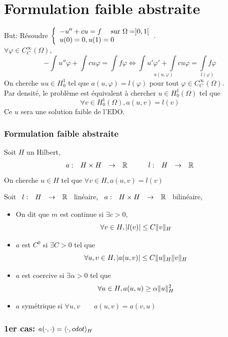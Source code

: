 \documentclass[]{report}
\begin{document}
    \section{Formulation faible abstraite}

    But: Résoudre $\left\{\begin{array}{ll} -u''+cu=f\quad\text{ sur $\Omega=]0,1[$}\\ u(0)=0,u(1)=0 \end{array} \right.$.\\
    $\forall \varphi\in C_C^\infty(\Omega)$,
    \[-\int u''\varphi+\int cu\varphi=\int f\varphi\iff \underset{a(u,\varphi)}{\int u'\varphi'+\int cu\varphi}=\underset{l(\varphi)}{\int f\varphi}\]
    On cherche $uu\in H_0^1$ tel que $a(u,\varphi)=l(\varphi)$ pour tout $\varphi \in C_C^\infty(\Omega)$.\\
    Par densité, le problème est équivalent à chercher $u\in H_0^1(\Omega)$ tel que
    \[\forall v\in H_0^1(\Omega),a(u,v)=l(v)\]
    Ce $u$ sera une solution faible de l'EDO.

    \subsubsection*{Formulation faible abstraite}

    Soit $H$ un Hilbert,
    \[\begin{array}{ccccc} a : & H\times H & \to & \mathbb{R} \end{array}\qquad \begin{array}{ccccc} l : & H & \to & \mathbb{R} \end{array}\]
    On cherche $u\in H$ tel que $\forall v\in H,a(u,v)=l(v)$

    \begin{df}{}{}
        Soit $\begin{array}{ccccc} l : & H & \to & \mathbb{R} \end{array}$ linéaire, $\begin{array}{ccccc} a : & H\times H & \to & \mathbb{R} \end{array}$ bilinéaire,
        \begin{itemize}
            \item On dit que $m$ est continue si $\exists c>0$,
            \[\forall v\in H,|l(v)|\le C\lVert v \rVert_H\]
            \item $a$ est $C^0$ si $\exists C>0$ tel que
            \[\forall u,v\in H,\left|a(u,v)\right|\le C\lVert u \rVert_H\lVert v \rVert_H\]
            \item $a$ est coercive si $\exists \alpha >0$ tel que
            \[\forall u\in H, a(u,u)\ge \alpha \lVert u \rVert_H^2\]
            \item $a$ symétrique si $\forall u,v\qquad a(u,v)=a(v,u)$
        \end{itemize}
    \end{df}

    \subsubsection*{1er cas: $a(\cdot,\cdot)=\langle \cdot,cdot \rangle_H$}
\end{document}
